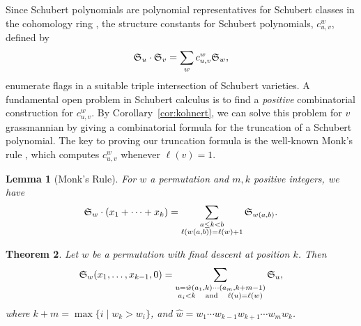 \documentclass[11pt]{amsart}
\newtheorem{theorem}{Theorem}[section]
\newtheorem{lemma}[theorem]{Lemma}
\theoremstyle{definition}
\theoremstyle{remark}
\numberwithin{equation}{section}
\newcommand{\schubert}{\ensuremath\mathfrak{S}}
\begin{document}
Since Schubert polynomials are polynomial representatives for Schubert classes in the cohomology ring \cite{LS82}, the structure constants for Schubert polynomials, $c_{u,v}^{w}$, defined by
\begin{equation}
  \schubert_{u} \cdot \schubert_{v} = \sum_{w} c_{u,v}^{w} \schubert_{w},
\label{e:basis}
\end{equation}
enumerate flags in a suitable triple intersection of Schubert varieties. A fundamental open problem in Schubert calculus is to find a \emph{positive} combinatorial construction for $c_{u,v}^{w}$. By Corollary~\ref{cor:kohnert}, we can solve this problem for $v$ grassmannian by giving a combinatorial formula for the truncation of a Schubert polynomial. The key to proving our truncation formula is the well-known Monk's rule \cite{Mon59}, which computes $c_{u,v}^{w}$ whenever $\ell(v)=1$.

\begin{lemma}[Monk's Rule]
  For $w$ a permutation and $m,k$ positive integers, we have
  \begin{equation}
    \schubert_w \cdot (x_1 + \cdots + x_k) = \sum_{\substack{a \leq k < b \\ \ell(w (a,b)) = \ell(w) + 1}} \schubert_{w (a,b)} .
    \label{e:monk}
  \end{equation}
  \label{lem:monk}
\end{lemma}

\begin{theorem}
  Let $w$ be a permutation with final descent at position $k$. Then
  \begin{equation}
    \schubert_w(x_1,\ldots,x_{k-1},0) = \sum_{\substack{u = \hat{w} (a_1,k) \cdots (a_m,k+m-1) \\ a_i < k \hspace{1em} \mathrm{and} \hspace{1em} \ell(u) = \ell(w)}} \schubert_u,
    \label{e:trunc}
  \end{equation}
  where $k+m = \max\{i \mid w_k > w_i\}$, and $\hat{w} = w_1 \cdots w_{k-1} w_{k+1} \cdots w_{m} w_k$.
  \label{thm:trunc}
\end{theorem}
\end{document}

